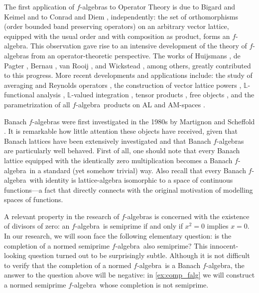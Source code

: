 \documentclass{memo-l}
\theoremstyle{definition}
\theoremstyle{remark}
\numberwithin{section}{chapter}
\numberwithin{equation}{chapter}
\newcommand{\falg}{$f\!$-algebra}
\begin{document}
The first application of \falg s to Operator Theory
is due to Bigard and Keimel \cite{bigard_keimel1969} and
to Conrad and Diem \cite{conrad_diem1971}, independently: the set of
orthomorphisms (order bounded band preserving operators) on an arbitrary vector lattice, equipped with the usual order and with composition as product, forms an \falg. This observation
gave rise to an intensive development of the theory of \falg s from an
operator-theoretic perspective. The works of Huijsmans
\cite{huijsmans1985,huijsmans1989}, de
Pagter
\cite{depagter1981,huijsmans_depagter1982,huijsmans_depagter1984_subalgebras,depagter1984},
Bernau
\cite{bernau_huijsmans1990_unit,bernau_huijsmans1990_algebras,bernau_huijsmans1995},
van Rooij \cite{buskes_depagter_vanrooij1991}, and Wickstead
\cite{wickstead1980,wickstead1987},
among others, greatly contributed to this progress. More recent
developments and applications include:
the study of averaging and Reynolds operators
\cite{boulabiar_buskes_triki2007}, the construction of vector
lattice powers \cite{boulabiar_buskes2006}, $\mathbb{L}$-functional
analysis \cite{kikianty_etal2024}, $\mathbb{L}$-valued integration
\cite{jiang_vanderwalt_wortel2024}, tensor products
\cite{buskes_wickstead2017,jaber2020}, free objects
\cite{keimel1995,de_jeu2021}, and the parametrization of all \falg\
products on AL and AM-spaces \cite{munoz-lahoz2025_products}.

Banach \falg s were first investigated in the 1980s by Martignon
\cite{martignon1980} and Scheffold
\cite{scheffold1981,scheffold1991,scheffold1993}. It is remarkable how
little attention these objects have received, given that Banach
lattices have been extensively investigated and that Banach \falg s are
particularly well behaved. First of all, one should note that every Banach lattice equipped with the
identically zero multiplication becomes a Banach \falg\ in a standard (yet somehow trivial) way. Also recall that every Banach \falg\ with identity is lattice-algebra isomorphic to a space
of continuous functions---a fact that directly connects with the original motivation
of modelling spaces of functions. 

A relevant property in the research of \falg s is concerned with the existence of divisors of zero: an \falg\ is semiprime if and only if $x^2=0$ implies $x=0$. In our research, we will soon face the following elementary question: is the
completion of a normed semiprime \falg\ also semiprime? This innocent-looking question turned out to be surprisingly subtle. Although it is not difficult to verify that the completion of a normed \falg\ is a Banach
\falg, the answer to the question above will be negative: in \cref{ex:comp_falg} we will construct a normed
semiprime \falg\ whose completion is not semiprime.
\end{document}
